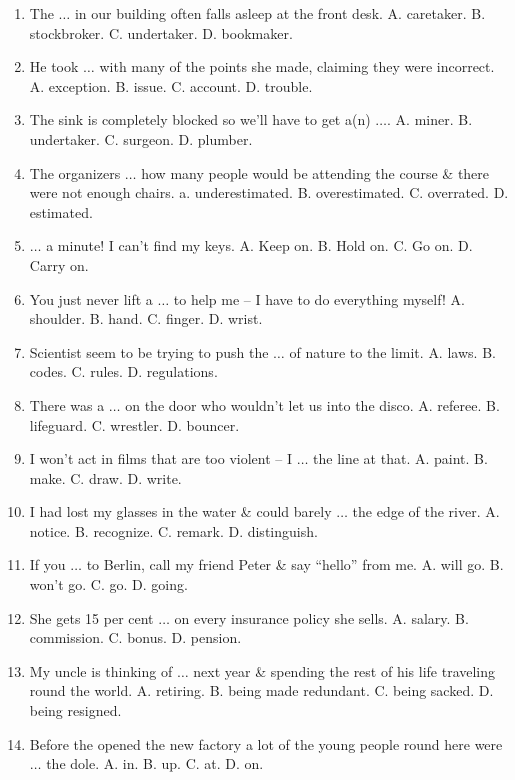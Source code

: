 \documentclass{article}
\numberwithin{equation}{section}
\begin{document}
\begin{enumerate}[leftmargin=8mm]
	\item The $\ldots$ in our building often falls asleep at the front desk. {\sf A.} caretaker. {\sf B.} stockbroker. {\sf C.} undertaker. {\sf D.} bookmaker.
	\item He took $\ldots$ with many of the points she made, claiming they were incorrect. {\sf A.} exception. {\sf B.} issue. {\sf C.} account. {\sf D.} trouble.
	\item The sink is completely blocked so we'll have to get a(n) $\ldots$. {\sf A.} miner. {\sf B.} undertaker. {\sf C.} surgeon. {\sf D.} plumber.
	\item The organizers $\ldots$ how many people would be attending the course \& there were not enough chairs. a. underestimated. {\sf B.} overestimated. {\sf C.} overrated. {\sf D.} estimated.
	\item $\ldots$ a minute! I can't find my keys. {\sf A.} Keep on. {\sf B.} Hold on. {\sf C.} Go on. {\sf D.} Carry on.
	\item You just never lift a $\ldots$ to help me -- I have to do everything myself! {\sf A.} shoulder. {\sf B.} hand. {\sf C.} finger. {\sf D.} wrist.
	\item Scientist seem to be trying to push the $\ldots$ of nature to the limit. {\sf A.} laws. {\sf B.} codes. {\sf C.} rules. {\sf D.} regulations.
	\item There was a $\ldots$ on the door who wouldn't let us into the disco. {\sf A.} referee. {\sf B.} lifeguard. {\sf C.} wrestler. {\sf D.} bouncer.
	\item I won't act in films that are too violent -- I $\ldots$ the line at that. {\sf A.} paint. {\sf B.} make. {\sf C.} draw. {\sf D.} write.
	\item I had lost my glasses in the water \& could barely $\ldots$ the edge of the river. {\sf A.} notice. {\sf B.} recognize. {\sf C.} remark. {\sf D.} distinguish.
	\item If you $\ldots$ to Berlin, call my friend Peter \& say ``hello'' from me. {\sf A.} will go. {\sf B.} won't go. {\sf C.} go. {\sf D.} going.
	\item She gets 15 per cent $\ldots$ on every insurance policy she sells. {\sf A.} salary. {\sf B.} commission. {\sf C.} bonus. {\sf D.} pension.
	\item My uncle is thinking of $\ldots$ next year \& spending the rest of his life traveling round the world. {\sf A.} retiring. {\sf B.} being made redundant. {\sf C.} being sacked. {\sf D.} being resigned.
	\item Before the opened the new factory a lot of the young people round here were $\ldots$ the dole. {\sf A.} in. {\sf B.} up. {\sf C.} at. {\sf D.} on.

\end{enumerate}
\end{document}
